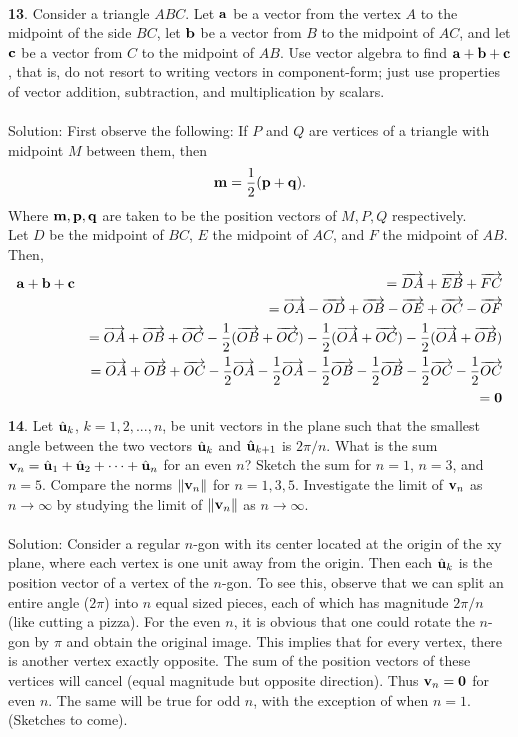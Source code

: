 \documentclass[12pt]{amsbook}
\begin{document}
\\
{\small\bf 13}. Consider a triangle $ABC$. Let ${\bf a}$ be a vector
from the vertex $A$ to the midpoint of the side $BC$, let ${\bf
b}$ be a vector from $B$ to the midpoint of $AC$, and let ${\bf
c}$ be a vector from $C$ to the midpoint of $AB$. Use vector
algebra to find ${\bf a} +{\bf b}+{\bf c}$, that is,
do not resort to writing
vectors in component-form; just use properties of vector
addition, subtraction, and multiplication by scalars.\\
\\
{\sc Solution}: First observe the following: If $P$ and $Q$ are vertices of a triangle with midpoint $M$ between them, then 
$${\bf m} = \frac 12(\bf p + q).$$
Where $\bf m, p, q$ are taken to be the position vectors of $M, P, Q$ respectively.
\\
Let $D$ be the midpoint of $BC$, $E$ the midpoint of $AC$, and $F$ the midpoint of $AB$. Then,
\begin{eqnarray*}
{\bf a+b+c}&&=\overrightarrow{DA}+ \overrightarrow{EB}+\overrightarrow{FC} \\
&&=\overrightarrow{OA}-\overrightarrow{OD}+\overrightarrow{OB}-\overrightarrow{OE}+\overrightarrow{OC}-\overrightarrow{OF} \\
&&=\overrightarrow{OA}+\overrightarrow{OB}+\overrightarrow{OC}-\frac 12(\overrightarrow{OB}+\overrightarrow{OC})-\frac 12(\overrightarrow{OA}+\overrightarrow{OC})-\frac 12(\overrightarrow{OA}+\overrightarrow{OB})\\
&&=\overrightarrow{OA}+\overrightarrow{OB}+\overrightarrow{OC}-\frac 12\overrightarrow{OA}-\frac 12\overrightarrow{OA}-\frac 12\overrightarrow{OB}-\frac 12\overrightarrow{OB}-\frac 12\overrightarrow{OC}-\frac 12\overrightarrow{OC}\\
&&=\bf 0
\end{eqnarray*}
{\small\bf 14}. Let $\hat{\bf u}_k$, 
$k=1,2,...,n$, be unit vectors in the
plane such that the smallest angle between 
the two vectors $\hat{\bf u}_k$ and 
$\hat{\bf u}_{k+1}$ is $2\pi/n$. What is the
sum ${\bf v}_n=\hat{\bf u}_1+\hat{\bf u}_2+
\cdots+ \hat{\bf u}_n$ for an even $n$? 
Sketch the sum for $n=1$, $n=3$, and $n=5$.
Compare the norms $\|{\bf v}_n\|$ for $n=1,3,5$.
Investigate the limit of ${\bf v}_n$
as $n\rightarrow \infty$ by studying 
the limit of $\|{\bf v}_n\|$ as
$n\rightarrow \infty$.\\
\\
{\sc Solution}:
Consider a regular $n$-gon with its center located at the origin of the xy plane, where each vertex is one unit away from the origin. Then each $\hat{\bf u}_k$ is the position vector of a vertex of the $n$-gon. To see this, observe that we can split an entire angle ($2\pi$) into $n$ equal sized pieces, each of which has magnitude $2\pi/n$ (like cutting a pizza). For the even $n$, it is obvious that one could rotate the $n$-gon by $\pi$ and obtain the original image. This implies that for every vertex, there is another vertex exactly opposite. The sum of the position vectors of these vertices will cancel (equal magnitude but opposite direction). Thus ${\bf v}_n=\bf 0$ for even $n$. The same will be true for odd $n$, with the exception of when $n=1$. (Sketches to come).
\end{document}
